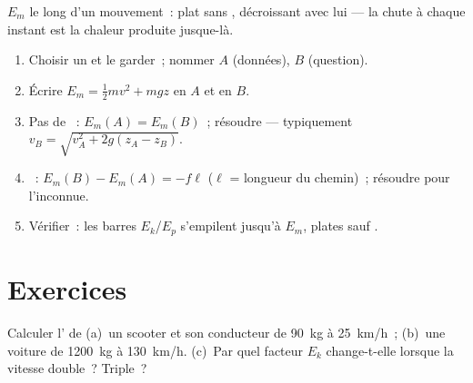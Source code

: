 \begin{omfigure}

{\small $E_m$ le long d'un mouvement~: plat sans
, décroissant avec lui --- la
chute à chaque instant est la chaleur produite jusque-là.}
\end{omfigure}

\begin{method}\label{met:g11:mechanical-energy:bookkeeping}
\begin{enumerate}
  \item Choisir un  et le garder~; nommer $A$ (données), $B$
        (question).
  \item Écrire $E_m = \tfrac12 mv^2 + mgz$ en $A$ et en $B$.
  \item Pas de ~:
        $E_m(A) = E_m(B)$~; résoudre --- typiquement
        $v_B = \sqrt{v_A^2 + 2g(z_A - z_B)}$.
  \item {}~:
        $E_m(B) - E_m(A) = -f\ell$ ($\ell$ = longueur du chemin)~;
        résoudre pour l'inconnue.
  \item Vérifier~: les barres $E_k$/$E_p$ s'empilent jusqu'à $E_m$,
        plates sauf .
\end{enumerate}
\end{method}

\section{Exercices}

\begin{exercise}[$\star$]\label{exo:g11:mechanical-energy:1}
Calculer l' de
(a)~un scooter et son conducteur de \qty{90}{kg} à \qty{25}{km/h}~;
(b)~une voiture de \qty{1200}{kg} à \qty{130}{km/h}. (c)~Par quel
facteur $E_k$ change-t-elle lorsque la vitesse double~? Triple~?
\end{exercise}

